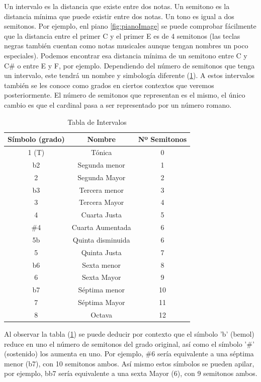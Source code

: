 Un intervalo es la distancia que existe entre dos notas. Un semitono es la distancia mínima que puede existir entre dos notas. Un tono es igual a dos semitonos. Por ejemplo, enl piano \ref{fig:pianoImage} se puede comprobar fácilmente que la distancia entre el primer C y el primer E es de 4 semitonos (las teclas negras también cuentan como notas musicales aunque tengan nombres un poco especiales). Podemos encontrar esa distancia mínima de un semitono entre C y C\# o entre E y F, por ejemplo. Dependiendo del número de semitonos que tenga un intervalo, este tendrá un nombre y simbología diferente (\ref{tab:tabla_intervalos}). A estos intervalos también se les conoce como grados en ciertos contextos que veremos posteriormente. El número de semitonos que representan es el mismo, el único cambio es que el cardinal pasa a ser representado por un número romano.

\begin{table}[h]
    \centering
    \begin{tabular}{c|c|c}
        \textbf{Símbolo (grado)} & \textbf{Nombre} & \textbf{Nº Semitonos} \\
        \hline
        1 (T) & Tónica & 0 \\
        b2 & Segunda menor & 1 \\
        2 & Segunda Mayor & 2 \\
        b3 & Tercera menor & 3 \\
        3 & Tercera Mayor & 4 \\
        4 & Cuarta Justa & 5 \\
        \#4 & Cuarta Aumentada & 6 \\
        5b & Quinta disminuida & 6 \\
        5 & Quinta Justa & 7 \\
        b6 & Sexta menor & 8 \\
        6 & Sexta Mayor & 9 \\
        b7 & Séptima menor & 10 \\
        7 & Séptima Mayor & 11 \\
        8 & Octava & 12 \\
    \end{tabular}
    \caption{Tabla de Intervalos}
    \label{tab:tabla_intervalos}
\end{table}

Al observar la tabla (\ref{tab:tabla_intervalos}) se puede deducir por contexto que el símbolo 'b' (bemol) reduce en uno el número de semitonos del grado original, así como el símbolo '\#' (sostenido) los aumenta en uno. Por ejemplo, \#6 sería equivalente a una séptima menor (b7), con 10 semitonos ambos. Así mismo estos símbolos se pueden apilar, por ejemplo, bb7 sería equivalente a una sexta Mayor (6), con 9 semitonos ambos.


